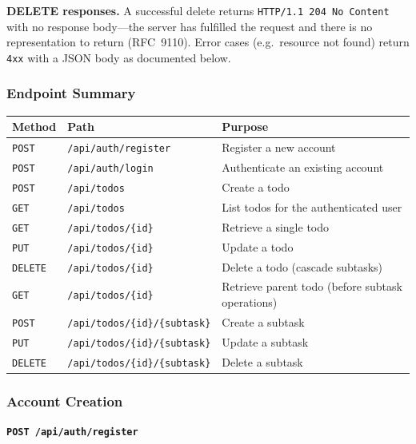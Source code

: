 \medskip
\noindent\textbf{DELETE responses.} A successful delete returns \texttt{HTTP/1.1 204 No Content} with no
response body---the server has fulfilled the request and there is no representation to return (RFC~9110).
Error cases (e.g.\ resource not found) return \texttt{4xx} with a JSON body as documented below.

\subsubsection{Endpoint Summary}
\begin{tabularx}{\textwidth}{@{} l l X @{}}
  \toprule
  \textbf{Method} & \textbf{Path} & \textbf{Purpose} \\
  \midrule
  \texttt{POST}   & \texttt{/api/auth/register}           & Register a new account \\
  \texttt{POST}   & \texttt{/api/auth/login}              & Authenticate an existing account \\
  \texttt{POST}   & \texttt{/api/todos}                   & Create a todo \\
  \texttt{GET}    & \texttt{/api/todos}                   & List todos for the authenticated user \\
  \texttt{GET}    & \texttt{/api/todos/\{id\}}            & Retrieve a single todo \\
  \texttt{PUT}    & \texttt{/api/todos/\{id\}}            & Update a todo \\
  \texttt{DELETE} & \texttt{/api/todos/\{id\}}            & Delete a todo (cascade subtasks) \\
  \texttt{GET}    & \texttt{/api/todos/\{id\}}            & Retrieve parent todo (before subtask operations) \\
  \texttt{POST}   & \texttt{/api/todos/\{id\}/\{subtask\}} & Create a subtask \\
  \texttt{PUT}    & \texttt{/api/todos/\{id\}/\{subtask\}} & Update a subtask \\
  \texttt{DELETE} & \texttt{/api/todos/\{id\}/\{subtask\}} & Delete a subtask \\
  \bottomrule
\end{tabularx}

\subsubsection{Account Creation}
\textbf{\texttt{POST /api/auth/register}}

